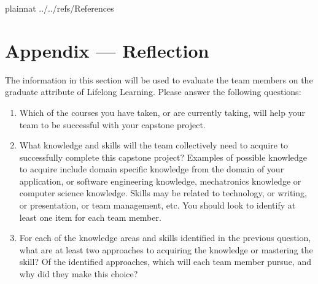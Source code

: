 \documentclass[12pt]{article}
\begin{document}
\newpage

 {plainnat}
 {../../refs/References}

\newpage

\newpage{}
\section*{Appendix --- Reflection}

The information in this section will be used to evaluate the team members on the
graduate attribute of Lifelong Learning.  Please answer the following questions:

\begin{enumerate}
  \item Which of the courses you have taken, or are currently taking, will help
  your team to be successful with your capstone project.
  \item What knowledge and skills will the team collectively need to acquire to
  successfully complete this capstone project?  Examples of possible knowledge
  to acquire include domain specific knowledge from the domain of your
  application, or software engineering knowledge, mechatronics knowledge or
  computer science knowledge.  Skills may be related to technology, or writing,
  or presentation, or team management, etc.  You should look to identify at
  least one item for each team member.
  \item For each of the knowledge areas and skills identified in the previous
  question, what are at least two approaches to acquiring the knowledge or
  mastering the skill?  Of the identified approaches, which will each team
  member pursue, and why did they make this choice?
\end{enumerate}
\end{document}
